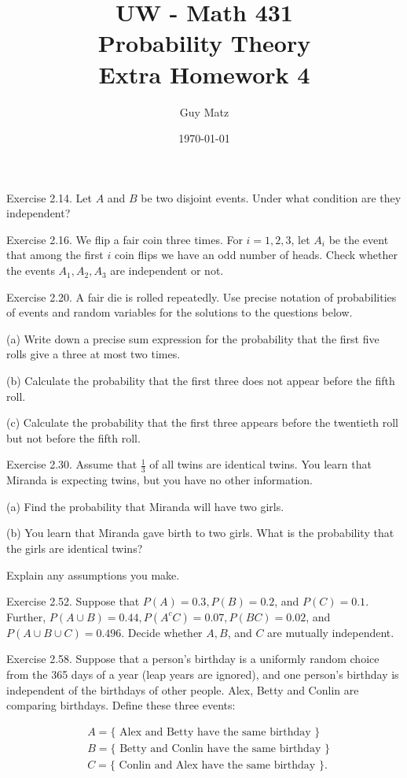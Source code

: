 \documentclass[10pt]{article}
\title{UW - Math 431 \\
Probability Theory \\
Extra Homework 4}
\author{Guy Matz}
\date{\today}
\begin{document}
\hfill \break
Exercise 2.14. Let $A$ and $B$ be two disjoint events. Under what condition are they independent?

\hfill \break
Exercise 2.16. We flip a fair coin three times. For $i=1,2,3$, let $A_{i}$ be the event that among the first $i$ coin flips we have an odd number of heads. Check whether the events $A_{1}, A_{2}, A_{3}$ are independent or not.

\hfill \break
Exercise 2.20. A fair die is rolled repeatedly. Use precise notation of probabilities of events and random variables for the solutions to the questions below.

(a) Write down a precise sum expression for the probability that the first five rolls give a three at most two times.

(b) Calculate the probability that the first three does not appear before the fifth roll.

(c) Calculate the probability that the first three appears before the twentieth roll but not before the fifth roll.

\hfill \break
Exercise 2.30. Assume that $\frac{1}{3}$ of all twins are identical twins. You learn that Miranda is expecting twins, but you have no other information.

(a) Find the probability that Miranda will have two girls.

(b) You learn that Miranda gave birth to two girls. What is the probability that the girls are identical twins?

Explain any assumptions you make.


\hfill \break
Exercise 2.52. Suppose that $P(A)=0.3, P(B)=0.2$, and $P(C)=0.1$. Further, $P(A \cup B)=0.44, P\left(A^{c} C\right)=0.07, P(B C)=0.02$, and $P(A \cup B \cup C)=0.496$. Decide whether $A, B$, and $C$ are mutually independent.


\hfill \break
Exercise 2.58. Suppose that a person's birthday is a uniformly random choice from the 365 days of a year (leap years are ignored), and one person's birthday is independent of the birthdays of other people. Alex, Betty and Conlin are comparing birthdays. Define these three events:

$$
\begin{aligned}
& A=\{\text { Alex and Betty have the same birthday }\} \\
& B=\{\text { Betty and Conlin have the same birthday }\} \\
& C=\{\text { Conlin and Alex have the same birthday }\} .
\end{aligned}
$$
\end{document}
